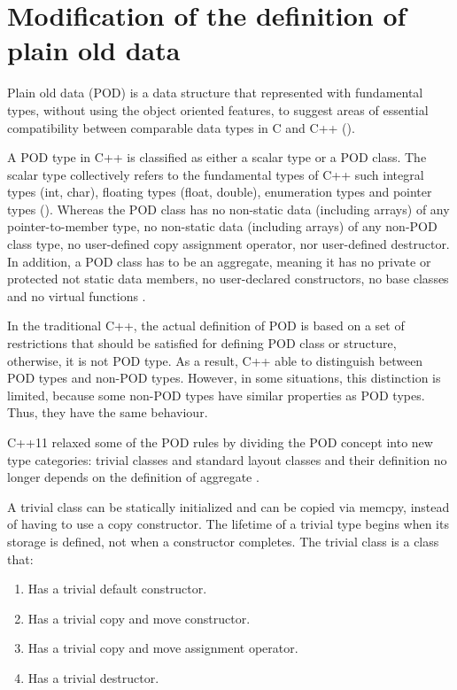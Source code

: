 \documentclass[11pt]{report}
\begin{document}
\section{Modification of the definition of plain old data}
\label{section: Modification of the definition of plain old data}
Plain old data (POD) is a data structure that represented with fundamental types, without using the object oriented features, to suggest areas of essential compatibility between comparable data types in C and C++ (\cite{Stroustrup:2012:Cpp11}).

A POD type in C++ is classified as either a scalar type or a POD class. The scalar type collectively refers to the fundamental types of C++ such integral types (int, char), floating types (float, double), enumeration types and pointer types (\cite{Stroustrup:2012:Cpp11}). Whereas the POD class has no non-static data (including arrays) of any pointer-to-member type, no non-static data (including arrays) of any non-POD class type, no user-defined copy assignment operator, nor user-defined destructor. In addition, a POD class has to be an aggregate, meaning it has no private or protected not static data members, no user-declared constructors, no base classes and no virtual functions \cite{Kalev:1999:ACP}.

In the traditional C++, the actual definition of POD is based on a set of restrictions that should be satisfied for defining POD class or structure, otherwise, it is not POD type. As a result, C++ able to distinguish between POD types and non-POD types. However, in some situations, this distinction is limited, because some non-POD types have similar properties as POD types. Thus, they have the same behaviour.

C++11 relaxed some of the POD rules by dividing the POD concept into new type categories: trivial classes and standard layout classes and their definition no longer depends on the definition of aggregate \cite{MSDN:2012:CppModern}.

A trivial class can be statically initialized and can be copied via memcpy, instead of having to use a copy constructor. The lifetime of a trivial type begins when its storage is defined, not when a constructor completes. 
The trivial class is a class that:
\begin{enumerate}
\item	Has a trivial default constructor. 
\item	Has a trivial copy and move constructor.
\item	Has a trivial copy and move assignment operator.
\item	Has a trivial destructor.
\end{enumerate}
\end{document}
